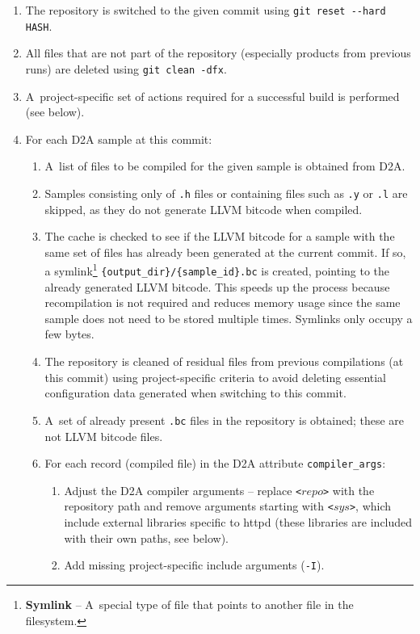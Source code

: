 \begin{enumerate}
    \item The repository is switched to the given commit using \texttt{git reset -{}-hard HASH}.
    \item All files that are not part of the repository (especially products from previous runs) are deleted using \texttt{git clean -dfx}.
    \item A~project-specific set of actions required for a successful build is performed (see below).
    \item For each D2A sample at this commit:
    \begin{enumerate}
        \item A~list of files to be compiled for the given sample is obtained from D2A.
        \item Samples consisting only of \texttt{.h} files or containing files such as \texttt{.y} or \texttt{.l} are skipped, as they do not generate LLVM bitcode when compiled.
        \item The cache is checked to see if the LLVM bitcode for a sample with the same set of files has already been generated at the current commit. If so, a symlink\footnote{\textbf{Symlink} -- A~special type of file that points to another file in the filesystem.} \texttt{\{output\_dir\}/\{sample\_id\}.bc} is created, pointing to the already generated LLVM bitcode. This speeds up the process because recompilation is not required and reduces memory usage since the same sample does not need to be stored multiple times. Symlinks only occupy a few bytes.
        \item The repository is cleaned of residual files from previous compilations (at this commit) using project-specific criteria to avoid deleting essential configuration data generated when switching to this commit.
        \item A~set of already present \texttt{.bc} files in the repository is obtained; these are not LLVM bitcode files.
        \item For each record (compiled file) in the D2A attribute \texttt{compiler\_args}:
        \begin{enumerate}
            \item Adjust the D2A compiler arguments -- replace \texttt{<$repo$>} with the repository path and remove arguments starting with \texttt{<$sys$>}, which include external libraries specific to httpd (these libraries are included with their own paths, see below).
            \item Add missing project-specific include arguments (\texttt{-I}).

\end{enumerate}
\end{enumerate}
\end{enumerate}
